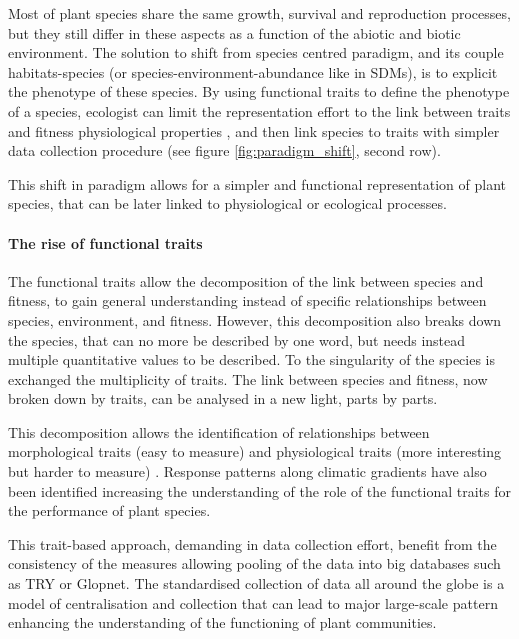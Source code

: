 Most of plant species share the same growth, survival and reproduction processes, but they still differ in these aspects as a function of the abiotic and biotic environment. The solution to shift from species centred paradigm, and its couple habitats-species (or species-environment-abundance like in SDMs), is to explicit the phenotype of these species. By using functional traits to define the phenotype of a species, ecologist can limit the representation effort to the link between traits and fitness physiological properties \parencite{reich_leaf_1992}, and then link species to traits with simpler data collection procedure \parencite{cornelissen_handbook_2003} (see figure \ref{fig:paradigm_shift}, second row).


This shift in paradigm allows for a simpler and functional representation of plant species, that can be later linked to physiological or ecological processes.




\paragraph{The rise of functional traits}

The functional traits allow the decomposition of the link between species and fitness, to gain general understanding instead of specific relationships between species, environment, and fitness. However, this decomposition also breaks down the species, that can no more be described by one word, but needs instead multiple quantitative values to be described. To the singularity of the species is exchanged the multiplicity of traits. The link between species and fitness, now broken down by traits, can be analysed in a new light, parts by parts.

This decomposition allows the identification of relationships between morphological traits (easy to measure) and physiological traits (more interesting but harder to measure) \parencite{ackerly_convergence_1999, poorter_leaf_2006,  reich_world-wide_2014}. Response patterns along climatic gradients have also been identified \parencite{niinemets_global-scale_2001} increasing the understanding of the role of the functional traits for the performance of plant species.

This trait-based approach, demanding in data collection effort, benefit from the consistency of the measures \cite{cornelissen_handbook_2003} allowing pooling of the data into big databases such as TRY or Glopnet. The standardised collection of data all around the globe is a model of centralisation and collection that can lead to major large-scale pattern enhancing the understanding of the functioning of plant communities.

